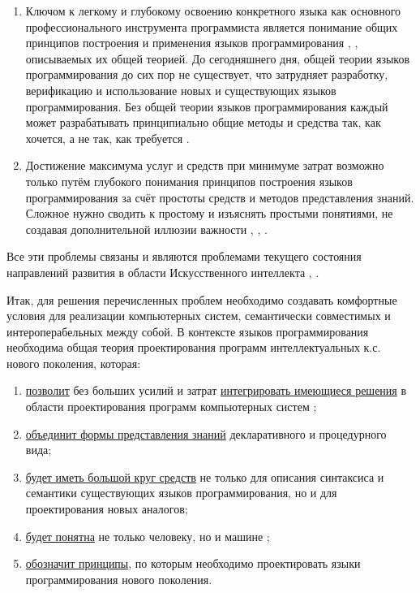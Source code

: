 \begin{enumerate}
    \item Ключом к легкому и глубокому освоению конкретного языка как основного профессионального инструмента программиста является понимание общих принципов построения и применения языков программирования \cite{Turner2007}, \cite{Constanta2022}, описываемых их общей теорией. До сегодняшнего дня, общей теории языков программирования до сих пор не существует, что затрудняет разработку, верификацию и использование новых и существующих языков программирования. Без общей теории языков программирования каждый может разрабатывать принципиально общие методы и средства так, как хочется, а не так, как требуется \cite{Golenkov2012}.
    \item Достижение максимума услуг и средств при минимуме затрат возможно только путём глубокого понимания принципов построения языков программирования за счёт простоты средств и методов представления знаний. Сложное нужно сводить к простому и изъяснять простыми понятиями, не создавая дополнительной иллюзии важности \cite{Sellitto2022}, \cite{Chaparro2014}, \cite{Posnett2011}.
\end{enumerate}

Все эти проблемы связаны и являются проблемами текущего состояния направлений развития в области Искусственного интеллекта \cite{Skeeter2020}, \cite{Constanta2022}.

Итак, для решения перечисленных проблем необходимо создавать комфортные условия для реализации компьютерных систем, семантически совместимых и интероперабельных между собой. В контексте языков программирования необходима общая теория проектирования программ интеллектуальных к.с. нового поколения, которая:
\begin{enumerate}
    \item \underline{позволит} без больших усилий и затрат \underline{интегрировать имеющиеся решения} в области проектирования программ компьютерных систем \cite{Golenkov2019};
    \item \underline{объединит формы представления знаний} декларативного и процедурного вида;
    \item \underline{будет иметь большой круг средств} не только для описания синтаксиса и семантики существующих языков программирования, но и для проектирования новых аналогов;
    \item \underline{будет понятна} не только человеку, но и машине \cite{Zapata2010};
    \item \underline{обозначит принципы}, по которым необходимо проектировать языки программирования нового поколения.
\end{enumerate}

